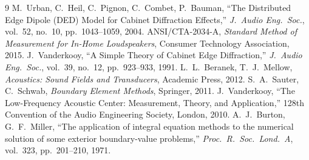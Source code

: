 \documentclass[11pt,a4paper]{article}
\begin{document}
\begin{thebibliography}{9}
 M.~Urban, C.~Heil, C.~Pignon, C.~Combet, P.~Bauman, ``The Distributed Edge Dipole
(DED) Model for Cabinet Diffraction Effects,'' \emph{J.\ Audio Eng.\ Soc.}, vol.~52, no.~10,
pp.~1043--1059, 2004.
 ANSI/CTA-2034-A, \emph{Standard Method of Measurement for In-Home Loudspeakers},
Consumer Technology Association, 2015.
 J.~Vanderkooy, ``A Simple Theory of Cabinet Edge Diffraction,''
\emph{J.\ Audio Eng.\ Soc.}, vol.~39, no.~12, pp.~923--933, 1991.
 L.~L.~Beranek, T.~J.~Mellow, \emph{Acoustics: Sound Fields and Transducers},
Academic Press, 2012.
 S.~A.~Sauter, C.~Schwab, \emph{Boundary Element Methods}, Springer, 2011.
 J.~Vanderkooy, ``The Low-Frequency Acoustic Center: Measurement, Theory, and
Application,'' 128th Convention of the Audio Engineering Society, London, 2010.
 A.~J.~Burton, G.~F.~Miller, ``The application of integral equation methods to the
numerical solution of some exterior boundary-value problems,'' \emph{Proc.\ R.\ Soc.\ Lond.\ A},
vol.~323, pp.~201--210, 1971.
\end{thebibliography}
\end{document}
